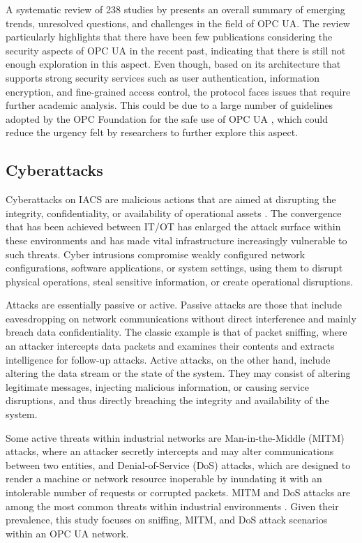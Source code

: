 \documentclass[pdflatex,sn-mathphys-num,iicol]{sn-jnl}%
\begin{document}
A systematic review of 238 studies by \cite{daSilva2023} presents an overall summary of emerging trends, unresolved questions, and challenges in the field of OPC UA. The review particularly highlights that there have been few publications considering the security aspects of OPC UA in the recent past, indicating that there is still not enough exploration in this aspect. Even though, based on its architecture that supports strong security services such as user authentication, information encryption, and fine-grained access control, the protocol faces issues that require further academic analysis. This could be due to a large number of guidelines adopted by the OPC Foundation for the safe use of OPC UA \cite{opcua2025}, which could reduce the urgency felt by researchers to further explore this aspect.

\subsection{Cyberattacks} \label{sec:cyberattacks}

Cyberattacks on IACS are malicious actions that are aimed at disrupting the integrity, confidentiality, or availability of operational assets \cite{turcato2020}. The convergence that has been achieved between IT/OT has enlarged the attack surface within these environments and has made vital infrastructure increasingly vulnerable to such threats. Cyber intrusions compromise weakly configured network configurations, software applications, or system settings, using them to disrupt physical operations, steal sensitive information, or create operational disruptions.

Attacks are essentially passive or active. Passive attacks are those that include eavesdropping on network communications without direct interference and mainly breach data confidentiality. The classic example is that of packet sniffing, where an attacker intercepts data packets and examines their contents and extracts intelligence for follow-up attacks. Active attacks, on the other hand, include altering the data stream or the state of the system. They may consist of altering legitimate messages, injecting malicious information, or causing service disruptions, and thus directly breaching the integrity and availability of the system.

Some active threats within industrial networks are Man-in-the-Middle (MITM) attacks, where an attacker secretly intercepts and may alter communications between two entities, and Denial-of-Service (DoS) attacks, which are designed to render a machine or network resource inoperable by inundating it with an intolerable number of requests or corrupted packets. MITM and DoS attacks are among the most common threats within industrial environments \cite{cekerevac2017}. Given their prevalence, this study focuses on sniffing, MITM, and DoS attack scenarios within an OPC UA network.
\end{document}
